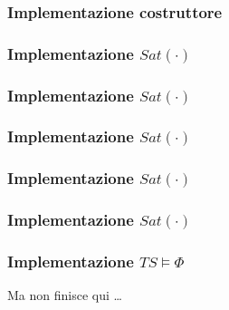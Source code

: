 \begin{frame}[fragile]
  \frametitle{Implementazione costruttore}
\end{frame}

\begin{frame}[fragile]
  \frametitle{Implementazione $Sat(\cdot)$}
\end{frame}

\begin{frame}[fragile]
  \frametitle{Implementazione $Sat(\cdot)$}
\end{frame}

\begin{frame}[fragile]
  \frametitle{Implementazione $Sat(\cdot)$}
\end{frame}

\begin{frame}[fragile]
  \frametitle{Implementazione $Sat(\cdot)$}
\end{frame}

\begin{frame}[fragile]
  \frametitle{Implementazione $Sat(\cdot)$}
\end{frame}

\begin{frame}[fragile]
  \frametitle{Implementazione $TS\models\Phi$}
  \begin{center}
    Ma non finisce qui \dots    
  \end{center}
\end{frame}

